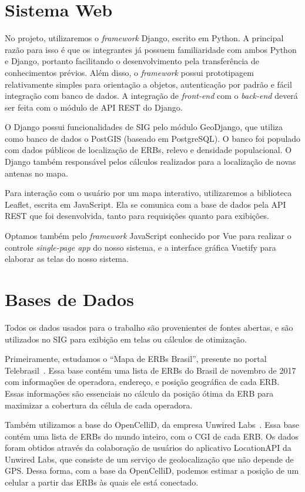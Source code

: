 \documentclass[]{politex}
\begin{document}
\section{Sistema Web}

No projeto, utilizaremos o \textit{framework} Django, escrito em Python. A
principal razão para isso é que os integrantes já possuem familiaridade com
ambos Python e Django, portanto facilitando o desenvolvimento pela transferência
de conhecimentos prévios. Além disso, o \textit{framework} possui prototipagem
relativamente simples para orientação a objetos, autenticação por padrão e fácil
integração com banco de dados. A integração de \textit{front-end} com o
\textit{back-end} deverá ser feita com o módulo de API REST do Django.

O Django possui funcionalidades de SIG pelo módulo GeoDjango, que utiliza como
banco de dados o PostGIS (baseado em PostgreSQL). O banco foi populado com dados
públicos de localização de ERBs, relevo e densidade populacional. O Django
também responsável pelos cálculos realizados para a localização de novas antenas
no mapa.

Para interação com o usuário por um mapa interativo, utilizaremos a biblioteca
Leaflet, escrita em JavaScript. Ela se comunica com a base de dados pela API
REST que foi desenvolvida, tanto para requisições quanto para exibições.

Optamos também pelo \textit{framework} JavaScript conhecido por Vue para
realizar o controle \textit{single-page app} do nosso sistema, e a interface
gráfica Vuetify para elaborar as telas do nosso sistema.

\section{Bases de Dados}

Todos os dados usados para o trabalho são provenientes de fontes abertas, e são
utilizados no SIG para exibição em telas ou cálculos de otimização.

Primeiramente, estudamos o ``Mapa de ERBs Brasil'', presente no portal
Telebrasil~\cite{mapa-erb}. Essa base contém uma lista de ERBs do Brasil de
novembro de 2017 com informações de operadora, endereço, e posição geográfica de
cada ERB. Essas informações são essenciais no cálculo da posição ótima da ERB
para maximizar a cobertura da célula de cada operadora.

Também utilizamos a base do OpenCelliD, da empresa Unwired
Labs~\cite{opencellid}. Essa base contém uma lista de ERBs do mundo inteiro, com
o CGI de cada ERB. Os dados foram obtidos através da colaboração de usuários do
aplicativo LocationAPI da Unwired Labs, que consiste de um serviço de
geolocalização que não depende de GPS. Dessa forma, com a base da OpenCelliD,
podemos estimar a posição de um celular a partir das ERBs às quais ele está
conectado.
\end{document}

